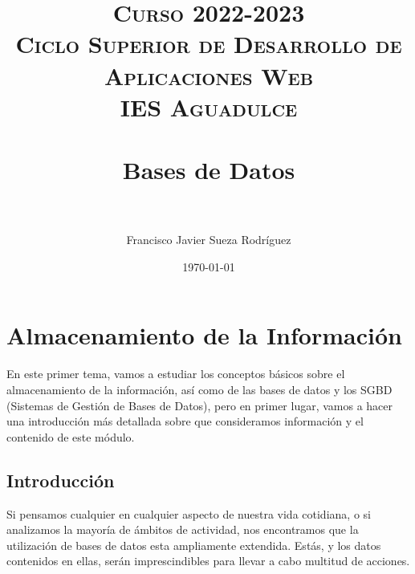 


\title{
\normalfont \normalsize
\textsc{{\bfseries Curso 2022-2023} \\ Ciclo Superior de Desarrollo de Aplicaciones Web \\ IES Aguadulce} \\ [25pt]
\horrule{0.5pt} \\[0.4cm]
\huge Bases de Datos \\
\horrule{0.5pt} \\[0.4cm]
}

\author{Francisco Javier Sueza Rodríguez}
\date{\normalsize\today}

\makeglossaries
{}



\maketitle

\newpage

\tableofcontents

\listoffigures


\newpage

\chapter{Almacenamiento de la Información}
En este primer tema, vamos a estudiar los conceptos básicos sobre el almacenamiento de la información, así como de las bases de datos y los SGBD (Sistemas de Gestión de Bases de Datos), pero en primer lugar, vamos a hacer una introducción más detallada sobre que consideramos información y el contenido de este módulo.

\section{Introducción}
Si pensamos cualquier en cualquier aspecto de nuestra vida cotidiana, o si analizamos la mayoría de ámbitos de actividad, nos encontramos que la utilización de bases de datos esta ampliamente extendida. Estás, y los datos contenidos en ellas, serán imprescindibles para llevar a cabo multitud de acciones.

